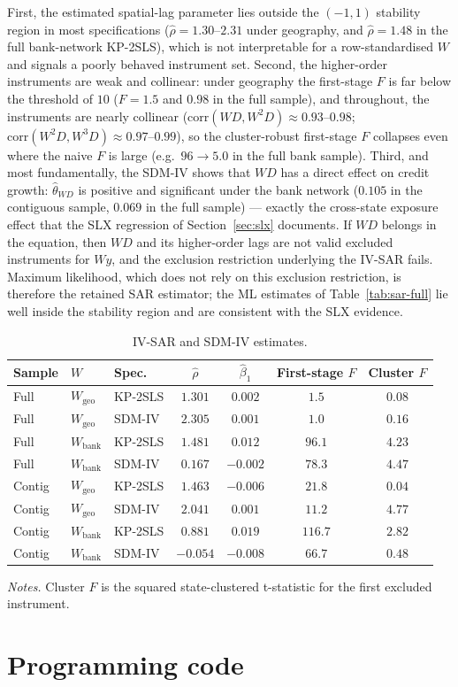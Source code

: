 First, the estimated spatial-lag parameter lies outside the $(-1,1)$ stability
region in most specifications ($\hat\rho=1.30$--$2.31$ under geography, and
$\hat\rho=1.48$ in the full bank-network KP-2SLS), which is not interpretable for a
row-standardised $W$ and signals a poorly behaved instrument set. Second, the
higher-order instruments are weak and collinear: under geography the first-stage
$F$ is far below the \citet{stock2002} threshold of $10$ ($F=1.5$ and $0.98$ in the
full sample), and throughout, the instruments are nearly collinear
($\mathrm{corr}(WD,W^2D)\approx0.93$--$0.98$;
$\mathrm{corr}(W^2D,W^3D)\approx0.97$--$0.99$), so the cluster-robust first-stage
$F$ collapses even where the naive $F$ is large (e.g.\ $96\to5.0$ in the full bank
sample). Third, and most fundamentally, the SDM-IV shows that $WD$ has a direct
effect on credit growth: $\hat\theta_{WD}$ is positive and significant under the
bank network ($0.105$ in the contiguous sample, $0.069$ in the full sample) ---
exactly the cross-state exposure effect that the SLX regression of
Section~\ref{sec:slx} documents. If $WD$ belongs in the equation, then $WD$ and its
higher-order lags are not valid excluded instruments for $Wy$, and the exclusion
restriction underlying the IV-SAR fails. Maximum likelihood, which does not rely on
this exclusion restriction, is therefore the retained SAR estimator; the ML
estimates of Table~\ref{tab:sar-full} lie well inside the stability region and are
consistent with the SLX evidence.
 
\begin{table}[htbp]
  \centering
  \caption{IV-SAR and SDM-IV estimates.}
  \label{tab:ivsar}
  \footnotesize
  \begin{tabular}{lllcccc}
    \toprule
    Sample & $W$ & Spec. & $\hat\rho$ & $\hat\beta_1$ & First-stage $F$ & Cluster $F$ \\
    \midrule
    Full & $W_{\text{geo}}$ & KP-2SLS & $1.301$ & $0.002$ & $1.5$ & $0.08$ \\
    Full & $W_{\text{geo}}$ & SDM-IV & $2.305$ & $0.001$ & $1.0$ & $0.16$ \\
    Full & $W_{\text{bank}}$ & KP-2SLS & $1.481$ & $0.012$ & $96.1$ & $4.23$ \\
    Full & $W_{\text{bank}}$ & SDM-IV & $0.167$ & $-0.002$ & $78.3$ & $4.47$ \\
    \addlinespace
    Contig & $W_{\text{geo}}$ & KP-2SLS & $1.463$ & $-0.006$ & $21.8$ & $0.04$ \\
    Contig & $W_{\text{geo}}$ & SDM-IV & $2.041$ & $0.001$ & $11.2$ & $4.77$ \\
    Contig & $W_{\text{bank}}$ & KP-2SLS & $0.881$ & $0.019$ & $116.7$ & $2.82$ \\
    Contig & $W_{\text{bank}}$ & SDM-IV & $-0.054$ & $-0.008$ & $66.7$ & $0.48$ \\
    \bottomrule
  \end{tabular}
  \begin{tablenotes}\footnotesize
  \item \emph{Notes.} Cluster $F$ is the squared state-clustered t-statistic for the first excluded instrument.
  \end{tablenotes}
\end{table}
 



\section{Programming code}

